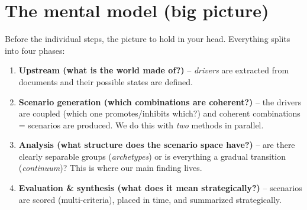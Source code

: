 \documentclass[11pt,a4paper]{article}
\begin{document}
\section{The mental model (big picture)}

Before the individual steps, the picture to hold in your head. Everything splits into four phases:

\begin{enumerate}
  \item \textbf{Upstream (what is the world made of?)} -- \emph{drivers} are extracted from documents and
  their possible states are defined.
  \item \textbf{Scenario generation (which combinations are coherent?)} -- the drivers are coupled
  (which one promotes/inhibits which?) and coherent combinations = scenarios are produced. We do this
  with \emph{two} methods in parallel.
  \item \textbf{Analysis (what structure does the scenario space have?)} -- are there clearly separable
  groups (\emph{archetypes}) or is everything a gradual transition (\emph{continuum})? This is where our
  main finding lives.
  \item \textbf{Evaluation \& synthesis (what does it mean strategically?)} -- scenarios are scored
  (multi-criteria), placed in time, and summarized strategically.
\end{enumerate}
\end{document}

